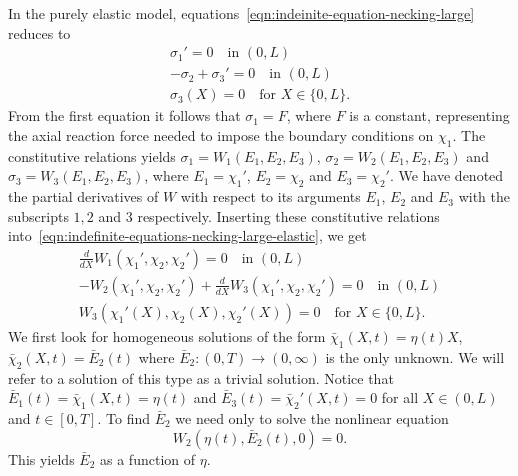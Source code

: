 \documentclass[a4paper,10pt,twoside]{amsbook}
\numberwithin{section}{chapter}
\numberwithin{equation}{chapter}
\theoremstyle{definition}
\begin{document}
In the purely elastic model, equations~\eqref{eqn:indeinite-equation-necking-large} reduces to
\begin{subequations}
\label{eqn:indefinite-equations-necking-large-elastic}
\begin{gather}
\sigma_1'=0\quad\text{in $(0,L)$} \\
-\sigma_2+\sigma_3'=0\quad\text{in $(0,L)$} \\
\sigma_3(X)=0\quad\text{for $X\in\{0,L\}$}.
\end{gather}
\end{subequations}
From the first equation it follows that $\sigma_1=F$, where $F$ is a constant, representing the axial reaction force needed to impose the boundary conditions on $\chi_1$. The constitutive relations yields $\sigma_1=W_1(E_1,E_2,E_3)$, $\sigma_2=W_2(E_1,E_2,E_3)$ and $\sigma_3=W_3(E_1,E_2,E_3)$, where $E_1=\chi_1'$, $E_2=\chi_2$ and $E_3=\chi_2'$. We have denoted the partial derivatives of $W$ with respect to its arguments $E_1$, $E_2$ and $E_3$ with the subscripts $1,2$ and $3$ respectively. Inserting these constitutive relations into~\eqref{eqn:indefinite-equations-necking-large-elastic}, we get
\begin{subequations}
\label{eqn:definite-equations-necking-large-elastic}
\begin{gather}
\frac{d}{dX}W_1(\chi_1',\chi_2,\chi_2')=0\quad\text{in $(0,L)$} \\
-W_2(\chi_1',\chi_2,\chi_2')+\frac{d}{dX}W_3(\chi_1',\chi_2,\chi_2')=0\quad\text{in $(0,L)$} \\
W_3(\chi_1'(X),\chi_2(X),\chi_2'(X))=0\quad\text{for $X\in\{0,L\}$}.
\end{gather}
\end{subequations}
We first look for homogeneous solutions of the form $\bar{\chi}_1(X,t)=\eta(t)X$, $\bar\chi_2(X,t)=\bar E_2(t)$ where $\bar E_2\colon(0,T)\to(0,\infty)$ is the only unknown. We will refer to a solution of this type as a trivial solution. Notice that $\bar E_1(t)=\bar\chi_1(X,t)=\eta(t)$ and $\bar E_3(t)=\bar\chi_2'(X,t)=0$ for all $X\in(0,L)$ and $t\in[0,T]$. To find $\bar E_2$ we need only to solve the nonlinear equation
\[
W_2(\eta(t),\bar E_2(t),0)=0.
\]
This yields $\bar E_2$ as a function of $\eta$.
\end{document}
